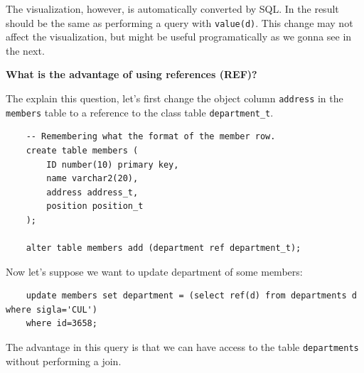 The visualization, however, is automatically converted by SQL. In the result should be the same as performing a query with \texttt{value(d)}. This change may not affect the visualization, but might be useful programatically as we gonna see in the next. 


\textbf{What is the advantage of using references (REF)?}

The explain this question, let's first change the object column \texttt{address} in the \texttt{members} table to a reference to the class table \texttt{department\_t}.

\begin{lstlisting}  
    -- Remembering what the format of the member row.
    create table members (
        ID number(10) primary key,
        name varchar2(20),
        address address_t,
        position position_t
    );

    alter table members add (department ref department_t);
\end{lstlisting}

Now let's suppose we want to update department of some members:

\begin{lstlisting}
    update members set department = (select ref(d) from departments d where sigla='CUL') 
    where id=3658;
\end{lstlisting}

The advantage in this query is that we can have access to the table \texttt{departments} without performing a join.


